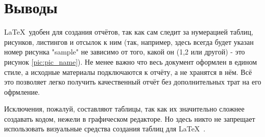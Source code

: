 \section{Выводы}
\LaTeX\ удобен для создания отчётов, так как сам следит за нумерацией таблиц, рисунков, листингов и отсылок к ним (так, например, здесь всегда будет указан номер рисунка "sample" не зависимо от того, какой он (1,2 или другой) - это рисунок \ref{pic:pic_name}). Не менее важно что весь документ оформлен в едином стиле, а исходные материалы подключаются к отчёту, а не хранятся в нём. Всё это позволяет легко получить качественный отчёт без дополнительных трат на его офрмление.

Исключения, пожалуй, составляют таблицы, так как их значительно сложнее создавать кодом, нежели в графическом редакторе. Но здесь никто не запрещает использовать визуальные средства создания таблиц для \LaTeX\ .

